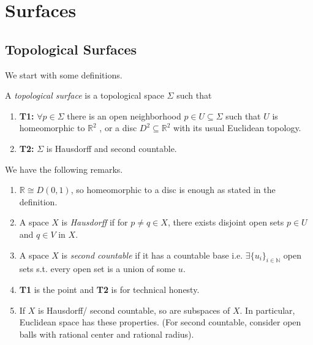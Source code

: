 \section{Surfaces}
\subsection{Topological Surfaces}
We start with some definitions.
\begin{definition}
    A \textit{topological surface} is a topological space \(\Sigma\) such that
    \begin{enumerate}
        \item \textbf{T1:} \(\forall p \in \Sigma\) there is an open neighborhood \(p \in U \subseteq \Sigma\) such that \(U\) is homeomorphic to \(\mathbb{R}^2\) , or a disc \(D^2 \subseteq \mathbb{R}^2\) with its usual Euclidean topology.
        \item \textbf{T2:} \(\Sigma\) is Hausdorff and second countable.
    \end{enumerate}
\end{definition}
\begin{remark}
    We have the following remarks.
    \begin{enumerate}
        \item \(\mathbb{R}\cong D(0,1)\), so homeomorphic to a disc is enough as stated in the definition.
        \item A space \(X\) is \textit{Hausdorff} if for \(p \neq q \in X\), there exists disjoint open sets \(p \in U\) and \(q \in V\) in \(X\).
        \item A space \(X\) is \textit{second countable} if it has a countable base i.e. \(\exists \{u_i\}_{i \in \mathbb{N}}\) open sets s.t. every open set is a union of some \(u\).
        \item \textbf{T1} is the point and \textbf{T2} is for technical honesty.
        \item If \(X\) is Hausdorff/ second countable, so are subspaces of \(X\). In particular, Euclidean space has these properties. (For second countable, consider open balls with rational center and rational radius).
    \end{enumerate}
\end{remark}
